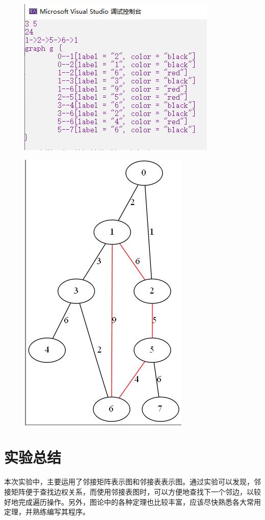 \documentclass[UTF8]{article}
\begin{document}
	\begin{figure}[H]
		\begin{minipage}[H]{0.48\linewidth}
			\centering
			\includegraphics[scale=0.45]{output32.jpg}
			\label{output32}
		\end{minipage}
		\qquad
		\begin{minipage}[H]{0.48\linewidth}
			\centering
			\includegraphics[scale=0.45]{output321.jpg}
			\label{output321}
		\end{minipage}
	\end{figure}
	

	\section{实验总结}
	本次实验中，主要运用了邻接矩阵表示图和邻接表表示图。通过实验可以发现，邻接矩阵便于查找边权关系，而使用邻接表图时，可以方便地查找下一个邻边，以较好地完成遍历操作。另外，图论中的各种定理也比较丰富，应该尽快熟悉各大常用定理，并熟练编写其程序。\par
\end{document}
